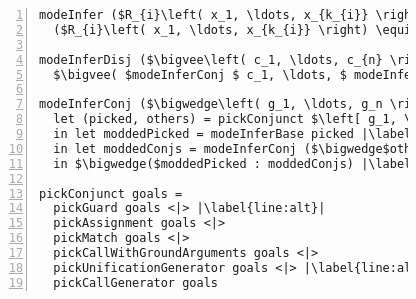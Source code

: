 


\begin{figure}[h]
  \centering
  \begin{minipage}{\columnwidth}
    \begin{lstlisting}[label={fig:modeInference},
                       caption={Mode inference pseudocode},
                       captionpos=b,
                       frame=tb,
                       escapechar=|,
                       numbers=left,
                       numberstyle={\footnotesize}]
modeInfer ($R_{i}\left( x_1, \ldots, x_{k_{i}} \right) \equiv body$) =
  ($R_{i}\left( x_1, \ldots, x_{k_{i}} \right) \equiv$ (modeInferDisj body)) |\label{line:body}|

modeInferDisj ($\bigvee\left( c_1, \ldots, c_{n} \right)$) =
  $\bigvee( $modeInferConj $ c_1, \ldots, $ modeInferConj $ c_{n})$ |\label{line:disj}|

modeInferConj ($\bigwedge\left( g_1, \ldots, g_n \right)$) =
  let (picked, others) = pickConjunct $\left[ g_1, \ldots, g_n \right]$ |\label{line:pick}|
  in let moddedPicked = modeInferBase picked |\label{line:pick_analyze}|
  in let moddedConjs = modeInferConj ($\bigwedge$others) |\label{line:conj}|
  in $\bigwedge($moddedPicked : moddedConjs) |\label{line:result}|

pickConjunct goals =
  pickGuard goals <|> |\label{line:alt}|
  pickAssignment goals <|>
  pickMatch goals <|>
  pickCallWithGroundArguments goals <|>
  pickUnificationGenerator goals <|> |\label{line:alt2}|
  pickCallGenerator goals
    \end{lstlisting}
  \end{minipage}
\end{figure}
